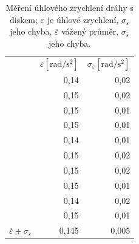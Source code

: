 \documentclass[english]{article}
\newcommand{\unit}[1]{\mathrm{#1}}
\begin{document}
\begin{table}[h!]
{}
\hfill
\parbox{.45\linewidth}{
\centering
    \begin{tabular}{|r|r|r|}
    \cline{2-3}    \multicolumn{1}{r|}{} & $\varepsilon \unit{[ rad/s^2]}$ & $\sigma_{\varepsilon}\unit{ [rad/s^2]}$ \bigstrut\\
    \cline{2-3}    \multicolumn{1}{r|}{} & 0,14  & 0,02 \bigstrut\\
    \cline{2-3}    \multicolumn{1}{r|}{} & 0,15  & 0,02 \bigstrut\\
    \cline{2-3}    \multicolumn{1}{r|}{} & 0,15  & 0,01 \bigstrut\\
    \cline{2-3}    \multicolumn{1}{r|}{} & 0,15  & 0,01 \bigstrut\\
    \cline{2-3}    \multicolumn{1}{r|}{} & 0,14  & 0,01 \bigstrut\\
    \cline{2-3}    \multicolumn{1}{r|}{} & 0,15  & 0,02 \bigstrut\\
    \cline{2-3}    \multicolumn{1}{r|}{} & 0,15  & 0,02 \bigstrut\\
    \cline{2-3}    \multicolumn{1}{r|}{} & 0,15  & 0,01 \bigstrut\\
    \cline{2-3}    \multicolumn{1}{r|}{} & 0,14  & 0,02 \bigstrut\\
    \cline{2-3}    \multicolumn{1}{r|}{} & 0,15  & 0,01 \bigstrut\\
        \hline
        $\overline{\varepsilon} \pm \sigma_{\overline{\varepsilon}} $ & 0,145 & 0,005 \bigstrut\\
        \hline
        \end{tabular}%
    

      
   
  \caption{Měření úhlového zrychlení dráhy s diskem; $\varepsilon$ je úhlové zrychlení, $\sigma_{\varepsilon}$ jeho chyba, $\overline{\varepsilon}$ vážený průměr, $\sigma_{\overline{\varepsilon}}$ jeho chyba.}
    \label{tab:steiner_draha_a_disk}%

}

\end{table}
\end{document}
